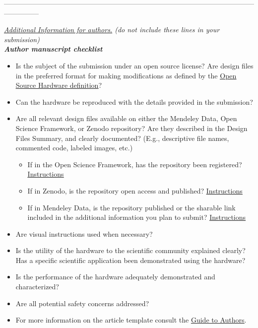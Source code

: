 \documentclass[11pt, letterpaper]{article}
\begin{document}
\begin{center}
---------------------------------------------------------------------------------------------------------------------------
\end{center}
{\it \underline{Additional Information for authors.} (do not include these lines in your submission)\\

\noindent
\textbf{Author manuscript checklist}
\begin{itemize}
\item[$\bullet$]Is the subject of the submission under an open source license? Are design files in the preferred format for making modifications as defined by the \href{http://www.oshwa.org/definition/}{\underline{Open Source Hardware definition}}?

\item[$\bullet$]Can the hardware be reproduced with the details provided in the submission?

\item[$\bullet$]Are all relevant design files available on either the Mendeley Data, Open Science Framework, or Zenodo repository? Are they described in the Design Files Summary, and clearly documented? (E.g., descriptive file names, commented code, labeled images, etc.) 
\begin{itemize}
\item[$\circ$]If in the Open Science Framework, has the repository been registered? \href{https://osf.io/wgk7q/wiki/home/}{\underline{Instructions}}
\item[$\circ$]If in Zenodo, is the repository open access and published? \href{https://doi.org/10.5281/zenodo.3346799}{\underline{Instructions}}
\item[$\circ$]If in Mendeley Data, is the repository published or the sharable link included in the additional information you plan to submit? \href{https://doi.org/10.5281/zenodo.3346799}{\underline{Instructions}}
\end{itemize}
\item[$\bullet$]Are visual instructions used when necessary?

\item[$\bullet$]Is the utility of the hardware to the scientific community explained clearly? Has a specific scientific application been demonstrated using the hardware?

\item[$\bullet$]Is the performance of the hardware adequately demonstrated and characterized?

\item[$\bullet$]Are all potential safety concerns addressed?

\item[$\bullet$]For more information on the article template consult the \href{https://www.elsevier.com/journals/hardwarex/2468-0672/guide-for-authors}{\underline{Guide to Authors}}.
\end{itemize}}
\end{document}
